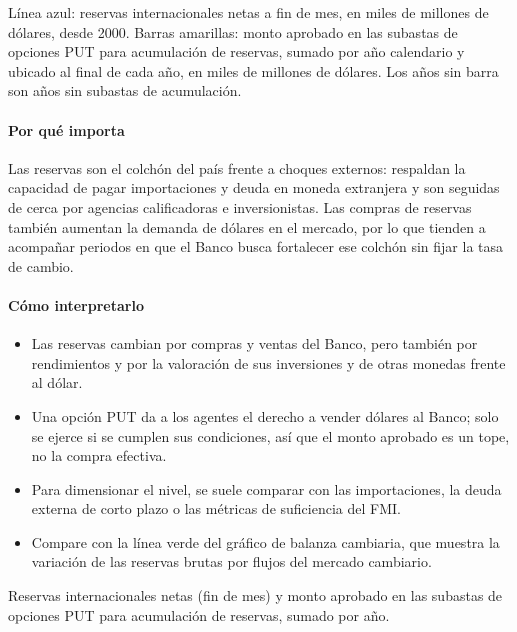 \begin{leer}
Línea azul: reservas internacionales netas a fin de mes, en miles de millones de dólares, desde 2000. Barras amarillas: monto aprobado en las subastas de opciones PUT para acumulación de reservas, sumado por año calendario y ubicado al final de cada año, en miles de millones de dólares. Los años sin barra son años sin subastas de acumulación.
\end{leer}

\paragraph{Por qué importa}
Las reservas son el colchón del país frente a choques externos: respaldan la capacidad de pagar importaciones y deuda en moneda extranjera y son seguidas de cerca por agencias calificadoras e inversionistas. Las compras de reservas también aumentan la demanda de dólares en el mercado, por lo que tienden a acompañar periodos en que el Banco busca fortalecer ese colchón sin fijar la tasa de cambio.

\paragraph{Cómo interpretarlo}
\begin{itemize}
\item Las reservas cambian por compras y ventas del Banco, pero también por rendimientos y por la valoración de sus inversiones y de otras monedas frente al dólar.
\item Una opción PUT da a los agentes el derecho a vender dólares al Banco; solo se ejerce si se cumplen sus condiciones, así que el monto aprobado es un tope, no la compra efectiva.
\item Para dimensionar el nivel, se suele comparar con las importaciones, la deuda externa de corto plazo o las métricas de suficiencia del FMI.
\item Compare con la línea verde del gráfico de balanza cambiaria, que muestra la variación de las reservas brutas por flujos del mercado cambiario.
\end{itemize}
\begin{formulas}[Fórmulas]
\end{formulas}
\begin{metodo}[Metodología]
Reservas internacionales netas (fin de mes) y monto aprobado en las subastas de opciones PUT para acumulación de reservas, sumado por año.
\par{}
\end{metodo}

